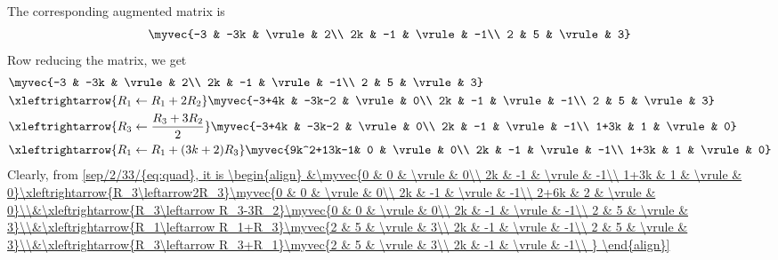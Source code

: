 {{{\begin{align}
\end{align}
The corresponding augmented matrix is 
\begin{align}
    \myvec{-3 & -3k & \vrule & 2\\
    2k & -1 & \vrule & -1\\
    2 &  5 & \vrule & 3}
\end{align}
Row reducing the matrix, we get
\begin{align}
    &\myvec{-3 & -3k & \vrule & 2\\
    2k & -1 & \vrule & -1\\
    2 &  5 & \vrule & 3}\\&\xleftrightarrow{R_1\leftarrow R_{1}+2R_{2}}\myvec{-3+4k & -3k-2 & \vrule & 0\\
    2k & -1 & \vrule & -1\\
    2 &  5 & \vrule & 3}\\
    &\xleftrightarrow{R_3\leftarrow \frac{R_{3}+3R_{2}}{2}}\myvec{-3+4k & -3k-2 & \vrule & 0\\
    2k & -1 & \vrule & -1\\
    1+3k &  1 & \vrule & 0}\\
    &\xleftrightarrow{R_1\leftarrow R_1+(3k+2)R_3}\myvec{9k^2+13k-1& 0 & \vrule & 0\\
    2k & -1 & \vrule & -1\\
    1+3k &  1 & \vrule & 0}
\end{align}
Clearly, from \eqref{sep/2/33/{eq:quad}, it is
\begin{align}
    &\myvec{0 & 0 & \vrule & 0\\
    2k & -1 & \vrule & -1\\
    1+3k &  1 & \vrule & 0}\xleftrightarrow{R_3\leftarrow2R_3}\myvec{0 & 0 & \vrule & 0\\
    2k & -1 & \vrule & -1\\
    2+6k &  2 & \vrule & 0}\\&\xleftrightarrow{R_3\leftarrow R_3-3R_2}\myvec{0 & 0 & \vrule & 0\\
    2k & -1 & \vrule & -1\\
    2 &  5 & \vrule & 3}\\&\xleftrightarrow{R_1\leftarrow R_1+R_3}\myvec{2 & 5 & \vrule & 3\\
    2k & -1 & \vrule & -1\\
    2 &  5 & \vrule & 3}\\&\xleftrightarrow{R_3\leftarrow R_3+R_1}\myvec{2 & 5 & \vrule & 3\\
    2k & -1 & \vrule & -1\\
}
\end{align}}}}}

